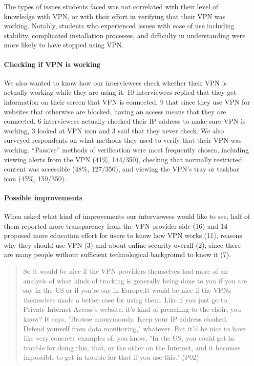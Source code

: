 The types of issues students faced was not correlated with their level of
knowledge with VPN, or with their effort in verifying that their VPN was
working. Notably, students who experienced issues with ease of use including
stability, complicated installation processes, and difficulty in understanding
were more likely to have stopped using VPN. 

\paragraph{Checking if VPN is working} We also wanted to know how our
interviewees check whether their VPN is actually working while they are using
it. 10 interviewees replied that they get information on their screen that VPN
is connected, 9 that since they use VPN for websites that otherwise are
blocked, having an access means that they are connected. 6 interviewees
actually checked their IP address to make sure VPN is working, 3 looked at VPN
icon and 3 said that they never check. 
We also surveyed respondents on what methods they used to verify that their
VPN was working. “Passive” methods of verification were most frequently
chosen, including viewing alerts from the VPN (41\%, 144/350), checking that
normally restricted content was accessible (48\%, 127/350), and viewing the
VPN’s tray or taskbar icon (45\%, 159/350).






\paragraph{Possible improvements} When asked what kind of improvements our
interviewees would like to see, half of them reported more transparency from
the VPN provider side (16) and 14 proposed more education effort for users to
know how VPN works (11), reasons why they should use VPN (3) and about online
security overall (2), since there are many people without sufficient
technological background to know it (7). 

\begin{quote}So it would be nice if the VPN providers themselves had more of
    an analysis of what kinds of tracking is generally being done to you if
    you are say in the US or if you're say in Europe.It would be nice if the
    VPNs themselves made a better case for using them. Like if you just go to
    Private Internet Access's website, it's kind of preaching to the choir,
    you know? It says, "Browse anonymously. Keep your IP address cloaked.
    Defend yourself from data monitoring," whatever. But it'd be nice to have
    like very concrete examples of, you know, "In the US, you could get in
    trouble for doing this, that, or the other on the Internet, and it becomes
    impossible to get in trouble for that if you use this." (P02)\end{quote}


